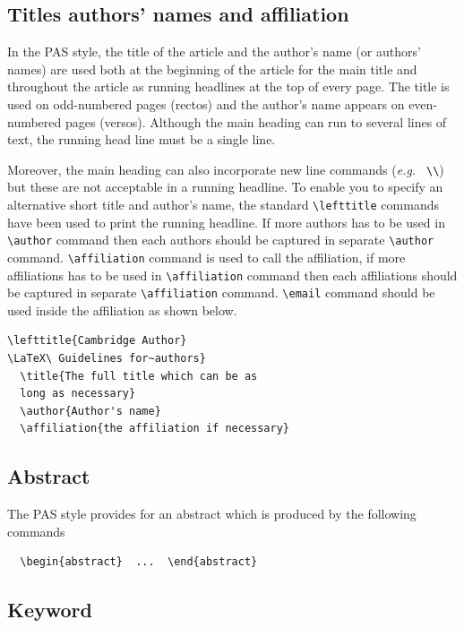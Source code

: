 \documentclass{pas}
\begin{document}
\subsection{Titles authors' names and affiliation}

In the PAS style, the title of the article and the author's name (or authors'
names) are used both at the beginning of the article for the main title and
throughout the article as running headlines at the top of every page.
The title is used on odd-numbered pages (rectos) and the author's name appears
on even-numbered pages (versos).
Although the main heading can run to several lines of text, the running head
line must be a single line.

Moreover, the main heading can also incorporate new line commands
({\it e.g.\ } \verb"\\") but these are not acceptable in a running headline.
To enable you to specify an alternative short title and author's name, the
standard \verb"\lefttitle" commands have been used to print the running headline. If more authors has to be used in \verb"\author" command then each authors should be captured in separate \verb"\author" command.
\verb"\affiliation" command is used to call the affiliation, if more affiliations has to be used in \verb"\affiliation" command then each affiliations should be captured in separate \verb"\affiliation" command.
\verb"\email" command should be used inside the affiliation as shown below.
%
\begin{verbatim}
\lefttitle{Cambridge Author}
\LaTeX\ Guidelines for~authors}
  \title{The full title which can be as
  long as necessary}
  \author{Author's name}
  \affiliation{the affiliation if necessary}
\end{verbatim}
%

\subsection{Abstract}

The PAS style provides for an abstract which is produced by the following
commands
%
\begin{verbatim}
  \begin{abstract}  ...  \end{abstract}
\end{verbatim}

\subsection{Keyword}
\end{document}
